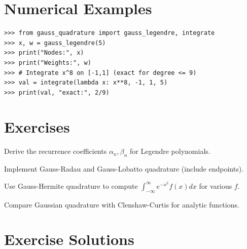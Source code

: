 \section{Numerical Examples}

\begin{example}
\begin{lstlisting}[style=python]
>>> from gauss_quadrature import gauss_legendre, integrate
>>> x, w = gauss_legendre(5)
>>> print("Nodes:", x)
>>> print("Weights:", w)
>>> # Integrate x^8 on [-1,1] (exact for degree <= 9)
>>> val = integrate(lambda x: x**8, -1, 1, 5)
>>> print(val, "exact:", 2/9)
\end{lstlisting}
\end{example}

\section{Exercises}

\begin{exercise}
Derive the recurrence coefficients $\alpha_n, \beta_n$ for Legendre polynomials.
\end{exercise}

\begin{exercise}
Implement Gauss-Radau and Gauss-Lobatto quadrature (include endpoints).
\end{exercise}

\begin{exercise}
Use Gauss-Hermite quadrature to compute $\int_{-\infty}^{\infty} e^{-x^2} f(x) dx$ for various $f$.
\end{exercise}

\begin{exercise}
Compare Gaussian quadrature with Clenshaw-Curtis for analytic functions.
\end{exercise}



\section{Exercise Solutions}

